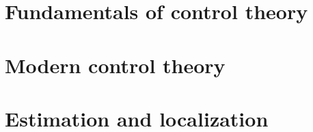 \documentclass[10pt]{book}
\begin{document}
\frontmatter





\renewcommand{\chaptermark}[1]{%
  \markboth{\sffamily\normalsize\bfseries #1}
           {\sffamily\normalsize\bfseries #1}}
\renewcommand{\sectionmark}[1]{%
  \markright{\sffamily\normalsize\bfseries #1}
            {\sffamily\normalsize\bfseries #1}}



\renewcommand{\chaptermark}[1]{%
  \markboth{\sffamily\normalsize\bfseries\chaptername\ \thechapter.\ #1}{}}
\renewcommand{\sectionmark}[1]{%
  \markright{\sffamily\normalsize\thesection\hspace{5pt}#1}{}}

\newcommand*{\partpath}{}
\newcommand*{\chapterpath}{}
\newcommand*{\sectionpath}{}

\mainmatter
\setcounter{chapter}{-1}

\renewcommand*{\partpath}{introduction}


\part{Fundamentals of control theory}
\label{part:fundamentals_of_control_theory}
\renewcommand*{\partpath}{fundamentals-of-control-theory}





\part{Modern control theory}
\label{part:modern_control_theory}
\renewcommand*{\partpath}{modern-control-theory}





\part{Estimation and localization}
\label{part:estimation_and_localization}
\renewcommand*{\partpath}{estimation-and-localization}


\end{document}
